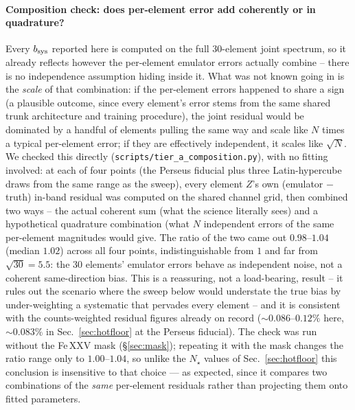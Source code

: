 \documentclass[11pt,a4paper]{article}
\newcommand{\code}[1]{\texttt{#1}}
\begin{document}
\paragraph{Composition check: does per-element error add coherently or in
quadrature?} Every $b_{\rm sys}$ reported here is computed on the full
30-element joint spectrum, so it already reflects however the per-element
emulator errors actually combine -- there is no independence assumption
hiding inside it. What was not known going in is the \emph{scale} of that
combination: if the per-element errors happened to share a sign (a plausible
outcome, since every element's error stems from the same shared trunk
architecture and training procedure), the joint residual would be dominated
by a handful of elements pulling the same way and scale like $N$ times a
typical per-element error; if they are effectively independent, it scales
like $\sqrt N$. We checked this directly (\code{scripts/tier\_a\_composition.py}),
with no fitting involved: at each of four points (the Perseus fiducial plus
three Latin-hypercube draws from the same range as the sweep), every element
$Z$'s own (emulator $-$ truth) in-band residual was computed on the shared
channel grid, then combined two ways -- the actual coherent sum (what the
science literally sees) and a hypothetical quadrature combination (what $N$
independent errors of the same per-element magnitudes would give. The ratio
of the two came out $0.98$--$1.04$ (median $1.02$) across all four points,
indistinguishable from $1$ and far from $\sqrt{30}=5.5$: the 30 elements'
emulator errors behave as independent noise, not a coherent same-direction
bias. This is a reassuring, not a load-bearing, result -- it rules out the
scenario where the sweep below would understate the true bias by
under-weighting a systematic that pervades every element -- and it is
consistent with the counts-weighted residual figures already on record
(${\sim}0.086$--$0.12\%$ here, ${\sim}0.083\%$ in Sec.~\ref{sec:hotfloor} at
the Perseus fiducial). The check was run without the Fe\,XXV mask
(\S\ref{sec:mask}); repeating it with the mask changes the ratio range only to
$1.00$--$1.04$, so unlike the $N_\star$ values of Sec.~\ref{sec:hotfloor} this
conclusion is insensitive to that choice --- as expected, since it compares two
combinations of the \emph{same} per-element residuals rather than projecting
them onto fitted parameters.
\end{document}
